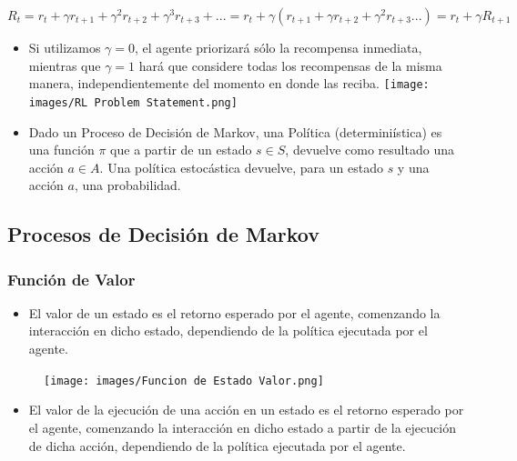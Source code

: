 \documentclass[11pt]{article}
\providecommand{\tightlist}{%
      \setlength{\itemsep}{0pt}\setlength{\parskip}{0pt}}
\begin{document}
\begin{equation} R_{t} = r_{t} + γr_{t+1} + γ^2r_{t+2} + γ^3r_{t+3} + ... = r_{t} + γ(r_{t+1} + γr_{t+2} + γ^2r_{t+3} ...) = r_{t} + γR_{t+1} \end{equation}

\begin{itemize}
\item
  Si utilizamos \(γ=0\), el agente priorizará sólo la recompensa
  inmediata, mientras que \(\gamma=1\) hará que considere todas los
  recompensas de la misma manera, independientemente del momento en
  donde las reciba. \texttt{[image: images/RL Problem Statement.png]}
\item
  Dado un Proceso de Decisión de Markov, una Política (determiniística)
  es una función \(\pi\) que a partir de un estado \(s \in S\), devuelve
  como resultado una acción \(a \in A\). Una política estocástica
  devuelve, para un estado \(s\) y una acción \(a\), una probabilidad.
\end{itemize}

    \subsection{Procesos de Decisión de
Markov}\label{procesos-de-decisiuxf3n-de-markov}

\subsubsection{Función de Valor}\label{funciuxf3n-de-valor}

\begin{itemize}
\tightlist
\item
  El valor de un estado es el retorno esperado por el agente, comenzando
  la interacción en dicho estado, dependiendo de la política ejecutada
  por el agente.
\end{itemize}

\begin{figure}
\centering
\texttt{[image: images/Funcion de Estado Valor.png]}
\caption{}
\end{figure}

\begin{itemize}
\tightlist
\item
  El valor de la ejecución de una acción en un estado es el retorno
  esperado por el agente, comenzando la interacción en dicho estado a
  partir de la ejecución de dicha acción, dependiendo de la política
  ejecutada por el agente.
\end{itemize}
\end{document}
